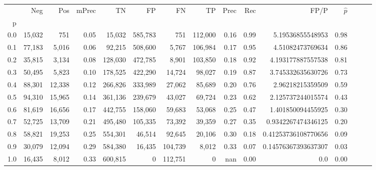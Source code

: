 \begin{tabular}{rrrrrrrrrrrrrrr}
\toprule
{} &     Neg &     Pos & mPrec &       TN &       FP &       FN &       TP &  Prec &   Rec &                 FP/P & $\hat{p}$ \\
p   &         &         &       &          &          &          &          &       &       &                      &           \\
\midrule
0.0 &  15,032 &     751 &  0.05 &   15,032 &  585,783 &      751 &  112,000 &  0.16 &  0.99 &     5.19536855548953 &      0.98 \\
0.1 &  77,183 &   5,016 &  0.06 &   92,215 &  508,600 &    5,767 &  106,984 &  0.17 &  0.95 &     4.51082473769634 &      0.86 \\
0.2 &  35,815 &   3,134 &  0.08 &  128,030 &  472,785 &    8,901 &  103,850 &  0.18 &  0.92 &    4.193177887557538 &      0.81 \\
0.3 &  50,495 &   5,823 &  0.10 &  178,525 &  422,290 &   14,724 &   98,027 &  0.19 &  0.87 &    3.745332635630726 &      0.73 \\
0.4 &  88,301 &  12,338 &  0.12 &  266,826 &  333,989 &   27,062 &   85,689 &  0.20 &  0.76 &     2.96218215359509 &      0.59 \\
0.5 &  94,310 &  15,965 &  0.14 &  361,136 &  239,679 &   43,027 &   69,724 &  0.23 &  0.62 &    2.125737244015574 &      0.43 \\
0.6 &  81,619 &  16,656 &  0.17 &  442,755 &  158,060 &   59,683 &   53,068 &  0.25 &  0.47 &    1.401850094455925 &      0.30 \\
0.7 &  52,725 &  13,709 &  0.21 &  495,480 &  105,335 &   73,392 &   39,359 &  0.27 &  0.35 &   0.9342267474346125 &      0.20 \\
0.8 &  58,821 &  19,253 &  0.25 &  554,301 &   46,514 &   92,645 &   20,106 &  0.30 &  0.18 &  0.41253736108770656 &      0.09 \\
0.9 &  30,079 &  12,094 &  0.29 &  584,380 &   16,435 &  104,739 &    8,012 &  0.33 &  0.07 &  0.14576367393637307 &      0.03 \\
1.0 &  16,435 &   8,012 &  0.33 &  600,815 &        0 &  112,751 &        0 &   nan &  0.00 &                  0.0 &      0.00 \\
\bottomrule
\end{tabular}
